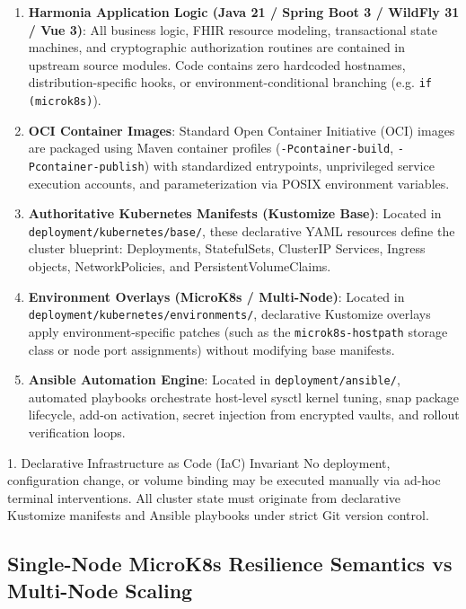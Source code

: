 \begin{enumerate}[label=\textbf{\arabic*.}]
    \item \textbf{Harmonia Application Logic (Java 21 / Spring Boot 3 / WildFly 31 / Vue 3)}: All business logic, FHIR resource modeling, transactional state machines, and cryptographic authorization routines are contained in upstream source modules. Code contains zero hardcoded hostnames, distribution-specific hooks, or environment-conditional branching (e.g. \texttt{if (microk8s)}).
    \item \textbf{OCI Container Images}: Standard Open Container Initiative (OCI) images are packaged using Maven container profiles (\texttt{-Pcontainer-build}, \texttt{-Pcontainer-publish}) with standardized entrypoints, unprivileged service execution accounts, and parameterization via POSIX environment variables.
    \item \textbf{Authoritative Kubernetes Manifests (Kustomize Base)}: Located in \texttt{deployment/kubernetes/base/}, these declarative YAML resources define the cluster blueprint: Deployments, StatefulSets, ClusterIP Services, Ingress objects, NetworkPolicies, and PersistentVolumeClaims.
    \item \textbf{Environment Overlays (MicroK8s / Multi-Node)}: Located in \texttt{deployment/kubernetes/environments/}, declarative Kustomize overlays apply environment-specific patches (such as the \texttt{microk8s-hostpath} storage class or node port assignments) without modifying base manifests.
    \item \textbf{Ansible Automation Engine}: Located in \texttt{deployment/ansible/}, automated playbooks orchestrate host-level sysctl kernel tuning, snap package lifecycle, add-on activation, secret injection from encrypted vaults, and rollout verification loops.
\end{enumerate}

\begin{principlebox}{1. Declarative Infrastructure as Code (IaC) Invariant}
No deployment, configuration change, or volume binding may be executed manually via ad-hoc terminal interventions. All cluster state must originate from declarative Kustomize manifests and Ansible playbooks under strict Git version control.
\end{principlebox}

\subsection{Single-Node MicroK8s Resilience Semantics vs Multi-Node Scaling}

